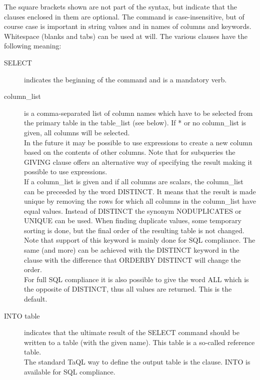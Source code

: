 The square brackets shown are not part of the syntax, but indicate
that the clauses enclosed in them are optional. The command is
case-insensitive, but of course case is important in string values and
in names of columns and keywords. Whitespace (blanks and tabs) can
be used at will.
The various clauses have the following meaning:
\begin{description}
  \item[ SELECT ]
       indicates the beginning of the command and is a mandatory verb.
  \item[ column\_list]
       is a comma-separated list of column names which have to be selected
       from the primary table in the table\_list (see below).
       If * or no column\_list is given, all columns will be selected.
       \\In the future it may be possible to use expressions to create
       a new column based on the contents of other columns.
       Note that for subqueries the GIVING clause offers an
       alternative way of specifying the result making it
       possible to use expressions.
       \\If a column\_list is given and if all columns are scalars, the
       column\_list can be preceeded by the word DISTINCT.
       It means that the result is made unique by removing the rows
       for which all columns in the column\_list have equal values.
       Instead of DISTINCT the synonym NODUPLICATES or UNIQUE can be used.
       When finding duplicate values, some temporary sorting is done,
       but the final order of the resulting table is not changed.
       \\Note that support of this keyword is mainly done for SQL
       compliance. The same (and more) can be achieved with the
       DISTINCT keyword in the  clause
       with the difference that ORDERBY DISTINCT will change the order.
       \\For full SQL compliance it is also possible to give the word
       ALL which is the opposite of DISTINCT, thus all values are
       returned. This is the default.
  \item[ \label{TAQL:INTO}INTO table ]
       indicates that the ultimate result of the SELECT command should be
       written to a table (with the given name). This table is a
       so-called reference table.
       \\The standard TaQL way to define the output table is the
        clause. INTO is available
       for SQL compliance.

\end{description}
